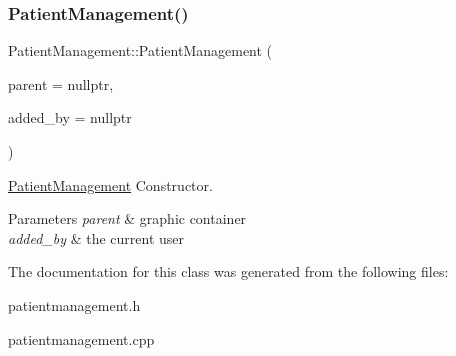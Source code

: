 \subsubsection{\texorpdfstring{PatientManagement()}{PatientManagement()}}
{\footnotesize\ttfamily Patient\+Management\+::\+Patient\+Management (\begin{DoxyParamCaption}\item[{Q\+Widget $\ast$}]{parent = {\ttfamily nullptr},  }\item[{Q\+String}]{added\+\_\+by = {\ttfamily nullptr} }\end{DoxyParamCaption})\hspace{0.3cm}{\ttfamily [explicit]}}



\mbox{\hyperlink{class_patient_management}{Patient\+Management}} Constructor. 


\begin{DoxyParams}{Parameters}
{\em parent} & graphic container \\
\hline
{\em added\+\_\+by} & the current user \\
\hline
\end{DoxyParams}


The documentation for this class was generated from the following files\+:\begin{DoxyCompactItemize}
\item 
patientmanagement.\+h\item 
patientmanagement.\+cpp\end{DoxyCompactItemize}
